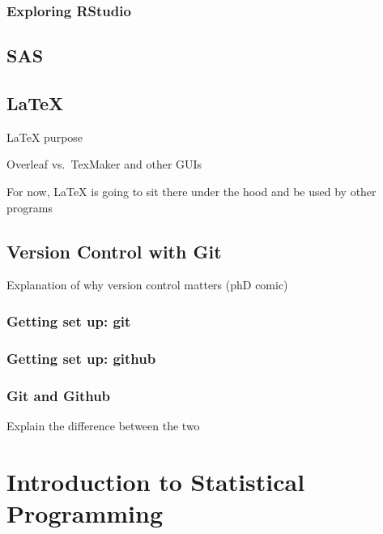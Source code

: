 \documentclass[]{book}
\begin{document}
\hypertarget{exploring-rstudio}{%
\subsection{Exploring RStudio}\label{exploring-rstudio}}

\hypertarget{sas}{%
\section{SAS}\label{sas}}

\hypertarget{latex}{%
\section{LaTeX}\label{latex}}

LaTeX purpose

Overleaf vs.~TexMaker and other GUIs

For now, LaTeX is going to sit there under the hood and be used by other programs

\hypertarget{version-control-with-git}{%
\section{Version Control with Git}\label{version-control-with-git}}

Explanation of why version control matters (phD comic)

\hypertarget{getting-set-up-git}{%
\subsection{Getting set up: git}\label{getting-set-up-git}}

\hypertarget{getting-set-up-github}{%
\subsection{Getting set up: github}\label{getting-set-up-github}}

\hypertarget{git-and-github}{%
\subsection{Git and Github}\label{git-and-github}}

Explain the difference between the two

\hypertarget{intro-prog}{%
\chapter{Introduction to Statistical Programming}\label{intro-prog}}
\end{document}
